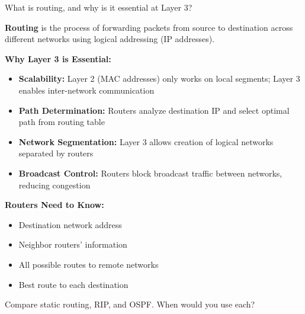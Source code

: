 \documentclass[12pt,a4paper]{article}
\begin{document}
\begin{qbox}{What is routing, and why is it essential at Layer 3?}
\end{qbox}

\begin{abox}
\textbf{Routing} is the process of forwarding packets from source to destination across different networks using logical addressing (IP addresses).

\textbf{Why Layer 3 is Essential:}
\begin{itemize}
    \item \textbf{Scalability:} Layer 2 (MAC addresses) only works on local segments; Layer 3 enables inter-network communication
    \item \textbf{Path Determination:} Routers analyze destination IP and select optimal path from routing table
    \item \textbf{Network Segmentation:} Layer 3 allows creation of logical networks separated by routers
    \item \textbf{Broadcast Control:} Routers block broadcast traffic between networks, reducing congestion
\end{itemize}

\textbf{Routers Need to Know:}
\begin{itemize}[noitemsep]
    \item Destination network address
    \item Neighbor routers' information
    \item All possible routes to remote networks
    \item Best route to each destination
\end{itemize}
\end{abox}


\begin{qbox}{Compare static routing, RIP, and OSPF. When would you use each?}
\end{qbox}
\end{document}
